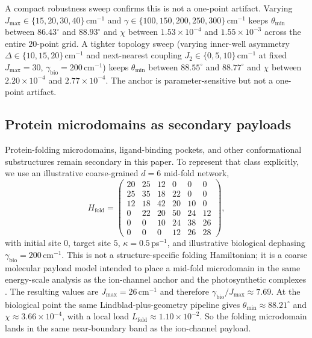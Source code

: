 \documentclass[11pt,a4paper]{article}
\theoremstyle{definition}
\theoremstyle{remark}
\begin{document}
A compact robustness sweep confirms this is not a one-point artifact. Varying $J_{\max}\in\{15,20,30,40\}$\,cm$^{-1}$ and $\gamma\in\{100,150,200,250,300\}$\,cm$^{-1}$ keeps $\theta_{\min}$ between $86.43^\circ$ and $88.93^\circ$ and $\chi$ between $1.53\times10^{-4}$ and $1.55\times10^{-3}$ across the entire $20$-point grid. A tighter topology sweep (varying inner-well asymmetry $\Delta\in\{10,15,20\}$\,cm$^{-1}$ and next-nearest coupling $J_2\in\{0,5,10\}$\,cm$^{-1}$ at fixed $J_{\max}=30$, $\gamma_{\mathrm{bio}}=200$\,cm$^{-1}$) keeps $\theta_{\min}$ between $88.55^\circ$ and $88.77^\circ$ and $\chi$ between $2.20\times10^{-4}$ and $2.77\times10^{-4}$. The anchor is parameter-sensitive but not a one-point artifact.

\subsection{Protein microdomains as secondary payloads}

Protein-folding microdomains, ligand-binding pockets, and other conformational substructures remain secondary in this paper. To represent that class explicitly, we use an illustrative coarse-grained $d=6$ mid-fold network,
\begin{equation}
H_{\mathrm{fold}}=
\begin{pmatrix}
20 & 25 & 12 & 0 & 0 & 0 \\
25 & 35 & 18 & 22 & 0 & 0 \\
12 & 18 & 42 & 20 & 10 & 0 \\
0 & 22 & 20 & 50 & 24 & 12 \\
0 & 0 & 10 & 24 & 38 & 26 \\
0 & 0 & 0 & 12 & 26 & 28
\end{pmatrix},
\end{equation}
with initial site $0$, target site $5$, $\kappa=0.5$\,ps$^{-1}$, and illustrative biological dephasing $\gamma_{\mathrm{bio}}=200$\,cm$^{-1}$. This is not a structure-specific folding Hamiltonian; it is a coarse molecular payload model intended to place a mid-fold microdomain in the same energy-scale analysis as the ion-channel anchor and the photosynthetic complexes \cite{dill2012protein}. The resulting values are $J_{\max}=26$\,cm$^{-1}$ and therefore $\gamma_{\mathrm{bio}}/J_{\max}\approx 7.69$. At the biological point the same Lindblad-plus-geometry pipeline gives $\theta_{\min}\approx 88.21^\circ$ and $\chi\approx 3.66\times10^{-4}$, with a local load $L_{\mathrm{fold}}\approx 1.10\times10^{-2}$. So the folding microdomain lands in the same near-boundary band as the ion-channel payload.
\end{document}
